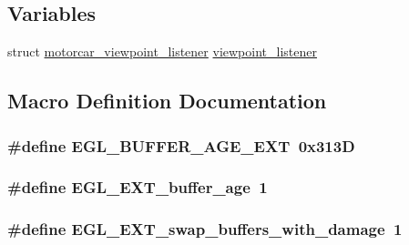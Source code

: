 \subsection*{Variables}
\begin{DoxyCompactItemize}
\item 
struct \hyperlink{structmotorcar__viewpoint__listener}{motorcar\-\_\-viewpoint\-\_\-listener} \hyperlink{simple-egl_8c_accee8e06dd6487760ee71ac0c347a035}{viewpoint\-\_\-listener}
\end{DoxyCompactItemize}


\subsection{Macro Definition Documentation}
\hypertarget{simple-egl_8c_a7045d8a6b4857f268a62fab2de2021fd}{
\subsubsection[{E\-G\-L\-\_\-\-B\-U\-F\-F\-E\-R\-\_\-\-A\-G\-E\-\_\-\-E\-X\-T}]{\setlength{\rightskip}{0pt plus 5cm}\#define E\-G\-L\-\_\-\-B\-U\-F\-F\-E\-R\-\_\-\-A\-G\-E\-\_\-\-E\-X\-T~0x313\-D}}\label{simple-egl_8c_a7045d8a6b4857f268a62fab2de2021fd}
\hypertarget{simple-egl_8c_a0792e3d8b2bc978f95917a234b0c81df}{
\subsubsection[{E\-G\-L\-\_\-\-E\-X\-T\-\_\-buffer\-\_\-age}]{\setlength{\rightskip}{0pt plus 5cm}\#define E\-G\-L\-\_\-\-E\-X\-T\-\_\-buffer\-\_\-age~1}}\label{simple-egl_8c_a0792e3d8b2bc978f95917a234b0c81df}
\hypertarget{simple-egl_8c_a083d37f289b99270e0391419178d458f}{
\subsubsection[{E\-G\-L\-\_\-\-E\-X\-T\-\_\-swap\-\_\-buffers\-\_\-with\-\_\-damage}]{\setlength{\rightskip}{0pt plus 5cm}\#define E\-G\-L\-\_\-\-E\-X\-T\-\_\-swap\-\_\-buffers\-\_\-with\-\_\-damage~1}}\label{simple-egl_8c_a083d37f289b99270e0391419178d458f}


